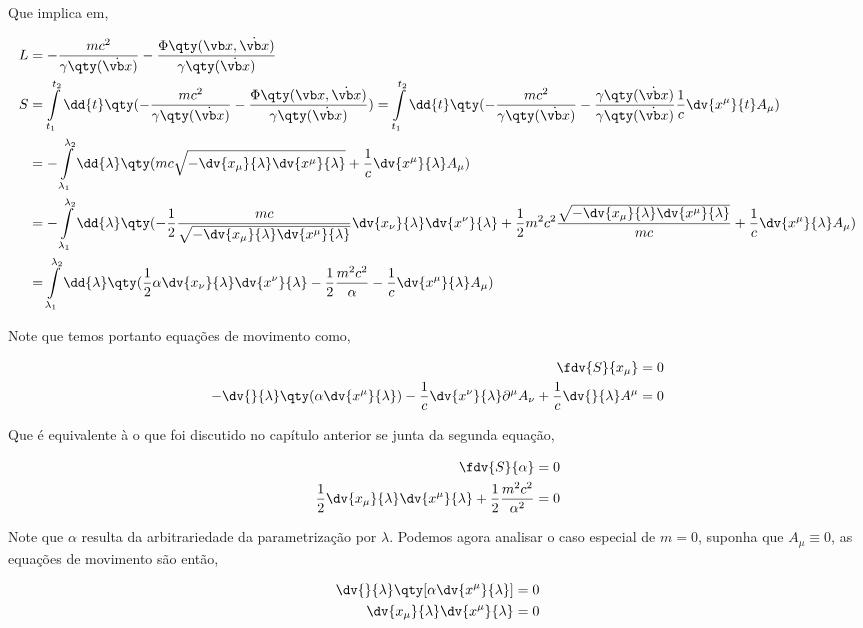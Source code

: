 \documentclass[twoside]{amsart}
\numberwithin{equation}{section}
\begin{document}
Que implica em,

\begin{align}
    L&=-\frac{mc^2}{\gamma\qty(\dot{\vb x})}-\frac{\Phi\qty(\vb x,\dot{\vb x})}{\gamma\qty(\dot{\vb x})}\\
    S&=\int\limits_{t_1}^{t_2}\dd{t}\qty(-\frac{mc^2}{\gamma\qty(\dot{\vb x})}-\frac{\Phi\qty(\vb x,\dot{\vb x})}{\gamma\qty(\dot{\vb x})})=\int\limits_{t_1}^{t_2}\dd{t}\qty(-\frac{mc^2}{\gamma\qty(\dot{\vb x})}-\frac{\gamma\qty(\dot{\vb x})}{\gamma\qty(\dot{\vb x})}\frac1c\dv{x^\mu}{t}A_\mu)\\
    &=-\int\limits_{\lambda_1}^{\lambda_2}\dd{\lambda}\qty(mc\sqrt{-\dv{x_\mu}{\lambda}\dv{x^\mu}{\lambda}}+\frac1c\dv{x^\mu}{\lambda}A_\mu)\\
    &=-\int\limits_{\lambda_1}^{\lambda_2}\dd{\lambda}\qty(-\frac12\frac{mc}{\sqrt{-\dv{x_\mu}{\lambda}\dv{x^\mu}{\lambda}}}\dv{x_\nu}{\lambda}\dv{x^\nu}{\lambda}+\frac12 m^2c^2\frac{\sqrt{-\dv{x_\mu}{\lambda}\dv{x^\mu}{\lambda}}}{mc}+\frac1c\dv{x^\mu}{\lambda}A_\mu)\\
    &=\int\limits_{\lambda_1}^{\lambda_2}\dd{\lambda}\qty(\frac12\alpha\dv{x_\nu}{\lambda}\dv{x^\nu}{\lambda}-\frac12 \frac{m^2c^2}{\alpha}-\frac1c\dv{x^\mu}{\lambda}A_\mu)
\end{align}

Note que temos portanto equações de movimento como,

\begin{align}
    \fdv{S}{x_\mu}&=0\\
    -\dv{}{\lambda}\qty(\alpha\dv{x^\mu}{\lambda})-\frac1c\dv{x^\nu}{\lambda}\partial^\mu A_\nu+\frac1c\dv{}{\lambda}A^\mu&=0
\end{align}

Que é equivalente à o que foi discutido no capítulo anterior se junta da segunda equação,

\begin{align}
    \fdv{S}{\alpha}&=0\\
    \frac12\dv{x_\mu}{\lambda}\dv{x^\mu}{\lambda}+\frac12\frac{m^2c^2}{\alpha^2}&=0
\end{align}

Note que $\alpha$ resulta da arbitrariedade da parametrização por $\lambda$. Podemos agora analisar o caso especial de $m=0$, suponha que $A_\mu\equiv 0$, as equações de movimento são então,

\begin{align}
    \dv{}{\lambda}\qty[\alpha\dv{x^\mu}{\lambda}]&=0\\
    \dv{x_\mu}{\lambda}\dv{x^\mu}{\lambda}&=0
\end{align}
\end{document}
